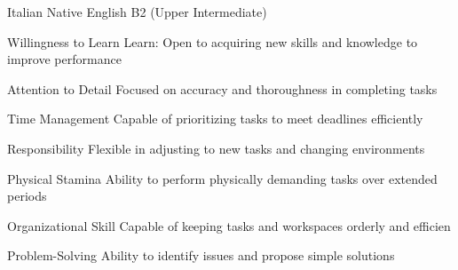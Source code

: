 


\begin{cvskills}
  \cvskill
    {Italian} %
    {Native} %
  \cvskill
    {English} %
    {B2 (Upper Intermediate)} %
\end{cvskills}


\begin{cvskills}
  \cvskill
    {Willingness to Learn} %
    {Learn: Open to acquiring new skills and knowledge to improve performance} %
    
  \cvskill
    {Attention to Detail} %
    {Focused on accuracy and thoroughness in completing tasks} %
    
  \cvskill
    {Time Management} %
    {Capable of prioritizing tasks to meet deadlines efficiently} %

  \cvskill
    {Responsibility} %
    {Flexible in adjusting to new tasks and changing environments} %

  \cvskill
    {Physical Stamina} %
    {Ability to perform physically demanding tasks over extended periods} %

\cvskill
    {Organizational Skill} %
    {Capable of keeping tasks and workspaces orderly and efficien} %

  \cvskill
    {Problem-Solving} %
    {Ability to identify issues and propose simple solutions} %

\end{cvskills}

